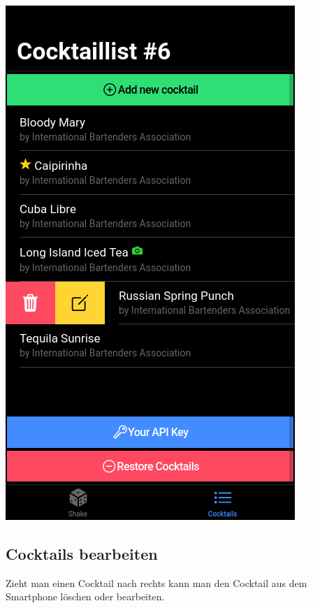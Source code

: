 \documentclass[a4paper, 10pt]{article}
\begin{document}
\begin{multicols}{4}
    \begin{center}
        \includegraphics[width=.8\linewidth]{CocktailList-3.png}
    \end{center}
    \columnbreak
    \subsection{Cocktails bearbeiten}
    Zieht man einen Cocktail nach rechts kann man den Cocktail aus dem Smartphone löschen oder bearbeiten.
    \columnbreak


\end{multicols}
\end{document}
